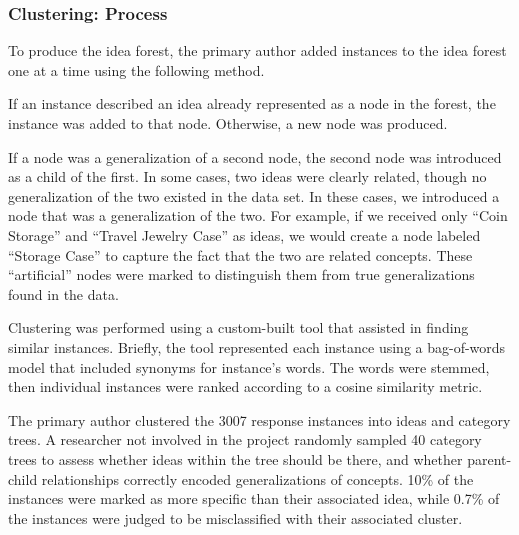 

\subsubsection{Clustering: Process}
To produce the idea forest, the primary author added instances to the idea forest one at a time using the following method.

If an instance described an idea already represented as a node in the forest, the instance was added to that node. Otherwise, a new node was produced.

If a node was a generalization of a second node, the second node was introduced as a child of the first. In some cases, two ideas were clearly related, though no generalization of the two existed in the data set. In these cases, we introduced a node that was a generalization of the two. For example, if we received only ``Coin Storage'' and ``Travel Jewelry Case'' as ideas, we would create a node labeled ``Storage Case'' to capture the fact that the two are related concepts. These ``artificial'' nodes were marked to distinguish them from true generalizations found in the data.

Clustering was performed using a custom-built tool that assisted in finding similar instances. Briefly, the tool represented each instance using a bag-of-words model that included synonyms for instance's words. The words were stemmed, then individual instances were ranked according to a cosine similarity metric.

The primary author clustered the 3007 response instances into ideas and category trees. A researcher not involved in the project randomly sampled 40 category trees to assess whether ideas within the tree should be there, and whether parent-child relationships correctly encoded generalizations of concepts. 10\% of the instances were marked as more specific than their associated idea, while 0.7\% of the instances were judged to be misclassified with their associated cluster.

